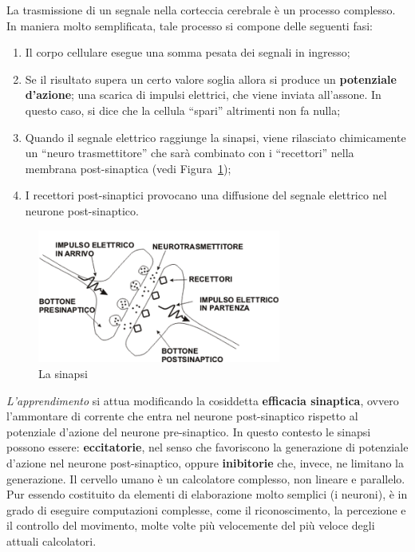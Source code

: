 \newpage
La trasmissione di un segnale nella corteccia cerebrale è un processo complesso.
In maniera molto semplificata, tale processo si compone delle seguenti fasi:
\begin{enumerate}
    \item Il corpo cellulare esegue una somma pesata dei segnali in ingresso;
    \item Se il risultato supera un certo valore soglia allora si produce un \textbf{potenziale d'azione}; una scarica di impulsi elettrici, che viene inviata all'assone. In questo caso, si dice che la cellula ``spari'' altrimenti non fa nulla;
    \item Quando il segnale elettrico raggiunge la sinapsi, viene rilasciato chimicamente un “neuro trasmettitore” che sarà combinato con i “recettori” nella membrana post-sinaptica (vedi Figura~\ref{fig:synapse});
    \item I recettori post-sinaptici provocano una diffusione del segnale elettrico nel neurone post-sinaptico.
\end{enumerate}

\begin{figure}[h!]
    \centering
    \includegraphics[width=8cm]{images/synapse.png}
    \caption{La sinapsi}\label{fig:synapse}
\end{figure}
\emph{L'apprendimento} si attua modificando la cosiddetta \textbf{efficacia sinaptica}, ovvero l'ammontare di corrente che entra nel neurone post-sinaptico rispetto al potenziale d'azione del neurone pre-sinaptico. In questo contesto le sinapsi possono essere: \textbf{eccitatorie}, nel senso che favoriscono la generazione di potenziale d'azione nel neurone post-sinaptico, oppure \textbf{inibitorie} che, invece, ne limitano la generazione.
Il cervello umano è un calcolatore complesso, non lineare e parallelo. Pur essendo costituito da elementi di elaborazione molto semplici (i neuroni), è in grado di eseguire computazioni complesse, come il riconoscimento, la percezione e il controllo del movimento, molte volte più velocemente del più veloce degli attuali calcolatori.\\

